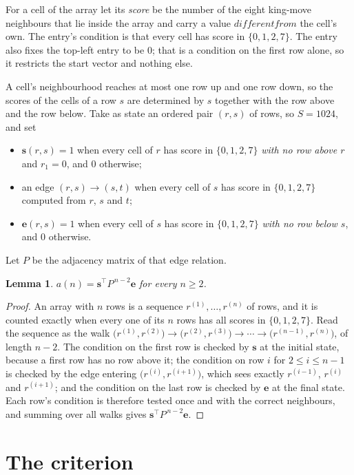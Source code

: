 \documentclass[11pt,a4paper]{article}
\theoremstyle{plain}
\newtheorem{lemma}[theorem]{Lemma}
\theoremstyle{definition}
\begin{document}
For a cell of the array let its \emph{score} be the number of the eight king-move neighbours that lie inside
the array and carry a value $different from$ the cell's own. The entry's condition is that every cell
has score in $\{0,1,2,7\}$. The entry also fixes the top-left entry to be $0$; that is a condition on the first row alone, so it restricts the start vector and nothing else.

A cell's neighbourhood reaches at most one row up and one row down, so the scores of the
cells of a row $s$ are determined by $s$ together with the row above and the row below.
Take as state an ordered pair $(r,s)$ of rows, so $S=1024$, and set
\begin{itemize}
\item $\mathbf{s}(r,s)=1$ when every cell of $r$ has score in $\{0,1,2,7\}$ \emph{with no row
above $r$} and $r_1=0$, and $0$ otherwise;
\item an edge $(r,s)\to(s,t)$ when every cell of $s$ has score in $\{0,1,2,7\}$ computed from
$r$, $s$ and $t$;
\item $\mathbf{e}(r,s)=1$ when every cell of $s$ has score in $\{0,1,2,7\}$ \emph{with no row
below $s$}, and $0$ otherwise.
\end{itemize}
Let $P$ be the adjacency matrix of that edge relation.

\begin{lemma}\label{lem:walk}
$a(n)=\mathbf{s}^{\!\top}P^{\,n-2}\mathbf{e}$ for every $n\ge2$.
\end{lemma}

\begin{proof}
An array with $n$ rows is a sequence $r^{(1)},\dots,r^{(n)}$ of rows, and it is counted
exactly when every one of its $n$ rows has all scores in $\{0,1,2,7\}$. Read the sequence as the
walk $\bigl(r^{(1)},r^{(2)}\bigr)\to\bigl(r^{(2)},r^{(3)}\bigr)\to\cdots\to
\bigl(r^{(n-1)},r^{(n)}\bigr)$, of length $n-2$. The condition on the first row is
checked by $\mathbf{s}$ at the initial state, because a first row has no row above it; the
condition on row $i$ for $2\le i\le n-1$ is checked by the edge entering
$\bigl(r^{(i)},r^{(i+1)}\bigr)$, which sees exactly $r^{(i-1)}$, $r^{(i)}$ and
$r^{(i+1)}$; and the condition on the last row is checked by $\mathbf{e}$ at the final
state. Each row's condition is therefore tested once and with the correct neighbours, and
summing over all walks gives $\mathbf{s}^{\!\top}P^{\,n-2}\mathbf{e}$.
\end{proof}

\section{The criterion}
\end{document}
